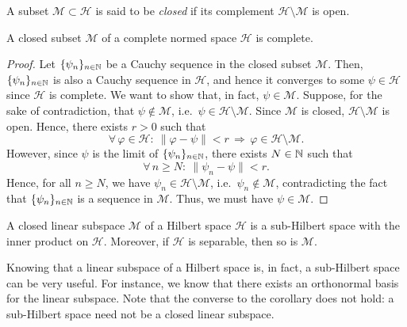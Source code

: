 \begin{definition}
A subset $\mathcal{M}\subset \mathcal{H}$ is said to be \emph{closed} if its complement $\mathcal{H}\setminus \mathcal{M}$ is open.
\end{definition}

\begin{proposition}
A closed subset $\mathcal{M}$ of a complete normed space $\mathcal{H}$ is complete.
\end{proposition}

\begin{proof}
Let $\{\psi_n\}_{n\in \mathbb{N}}$ be a Cauchy sequence in the closed subset $\mathcal{M}$. Then, $\{\psi_n\}_{n\in \mathbb{N}}$ is also a Cauchy sequence in $\mathcal{H}$, and hence it converges to some $\psi\in\mathcal{H}$ since $\mathcal{H}$ is complete. 
We want to show that, in fact, $\psi\in\mathcal{M}$. Suppose, for the sake of contradiction, that $\psi\notin\mathcal{M}$, i.e.\ $\psi\in\mathcal{H}\setminus\mathcal{M}$. Since $\mathcal{M}$ is closed, $\mathcal{H}\setminus \mathcal{M}$ is open. Hence, there exists $r>0$ such that
\begin{equation*}
\forall \, \varphi\in\mathcal{H}:\ \|\varphi -\psi\|< r \, \Rightarrow \, \varphi \in \mathcal{H}\setminus \mathcal{M}.
\end{equation*}
However, since $\psi$ is the limit of $\{\psi_n\}_{n\in \mathbb{N}}$, there exists $N\in \mathbb{N}$ such that
\begin{equation*}
\forall \, n\geq N : \ \|\psi_n-\psi\|<r.
\end{equation*}
Hence, for all $n\geq N$, we have $\psi_n \in  \mathcal{H}\setminus \mathcal{M}$, i.e.\  $\psi_n \notin\mathcal{M}$, contradicting the fact that  $\{\psi_n\}_{n\in \mathbb{N}}$ is a sequence in $\mathcal{M}$. Thus, we must have $\psi\in\mathcal{M}$.
\end{proof}

\begin{corollary}
A closed linear subspace $\mathcal{M}$ of a Hilbert space $\mathcal{H}$ is a sub-Hilbert space with the inner product on $\mathcal{H}$. Moreover, if $\mathcal{H}$ is separable, then so is $\mathcal{M}$.
\end{corollary}
Knowing that a linear subspace of a Hilbert space is, in fact, a sub-Hilbert space can be very useful. For instance, we know that there exists an orthonormal basis for the linear subspace.
Note that the converse to the corollary does not hold: a sub-Hilbert space need not be a closed linear subspace.

